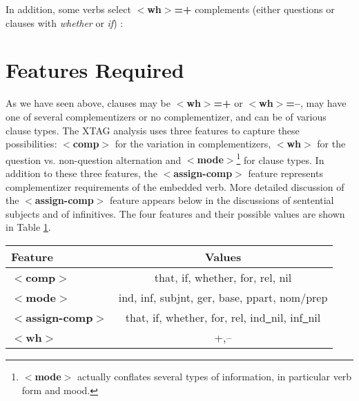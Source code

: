 \beginsentences
{}\label{ex:563} 
\label{ex:564} 
\label{ex:565} 
\label{ex:566} 
\endsentences

 
In addition, some verbs select {\bf $<$wh$>$=+} complements (either questions 
or clauses with {\it whether} or {\it if}) \cite{grimshaw90}: 
 
\beginsentences
{}\label{ex:567} 
\label{ex:568} 
\label{ex:569} 
\label{ex:570} 
\label{ex:571} 
\label{ex:572} 
\label{ex:573} 
\label{ex:574} 
\endsentences

 
\section{Features Required} 
\label{s-features} 
 
As we have seen above, clauses may be {\bf $<$wh$>$=+} or {\bf $<$wh$>$=--}, 
may have one of several complementizers or no complementizer, and can be of 
various clause types.  The XTAG analysis uses three features to capture these 
possibilities: {\bf $<$comp$>$} for the variation in complementizers, 
{\bf$<$wh$>$} for the question vs.  non-question alternation and {\bf $<$mode$>$}\footnote{{\bf $<$mode$>$} actually conflates several types of information, in particular verb form and mood.} for clause types.  In addition 
to these three features, the {\bf $<$assign-comp$>$} feature represents 
complementizer requirements of the embedded verb.  More detailed discussion of 
the {\bf $<$assign-comp$>$} feature appears below in the discussions of 
sentential subjects and of infinitives.  The four features and their possible 
values are shown in Table \ref{feat}. 
 
 
\begin{table}[th] 
\centering 
\begin{tabular}{|l|c|} \hline 
Feature&Values\\ 
\hline 
{\bf $<$comp$>$}&that, if, whether, for, rel, nil\\ 
\hline 
{\bf$<$mode$>$}&ind, inf, subjnt, ger, base, ppart, nom/prep\\ 
\hline 
{\bf$<$assign-comp$>$}&that, if, whether, for, rel, ind\underline{~}nil, inf\underline{~}nil\\ 
\hline 
{\bf$<$wh$>$}&+,--\\ 
\hline 
\end{tabular} 
\begin{rawhtml} <dl> <dt>{Summary of Relevant Features <p> </dl> \end{rawhtml}
\label{feat} 
\end{table} 
 
